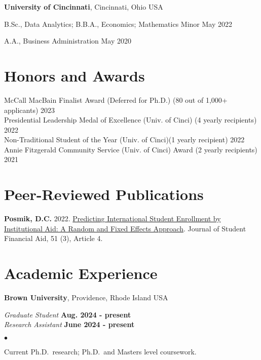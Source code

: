\documentclass[margin,line]{res}
\newenvironment{list1}{
  \begin{list}{\ding{113}}{%
      \setlength{\itemsep}{0in}
      \setlength{\parsep}{0in} \setlength{\parskip}{0in}
      \setlength{\topsep}{0in} \setlength{\partopsep}{0in} 
      \setlength{\leftmargin}{0.17in}}}{\end{list}}
\newenvironment{list2}{
  \begin{list}{$\bullet$}{%
      \setlength{\itemsep}{0in}
      \setlength{\parsep}{0in} \setlength{\parskip}{0in}
      \setlength{\topsep}{0in} \setlength{\partopsep}{0in} 
      \setlength{\leftmargin}{0.2in}}}{\end{list}}
\begin{document}
\begin{resume}
{\bf University of Cincinnati}, Cincinnati, Ohio USA\\
\vspace*{-.15in}
\begin{list1}
\item[] B.Sc., Data Analytics; B.B.A., Economics; Mathematics Minor \hfill May 2022
\item[] A.A., Business Administration \hfill May 2020
\end{list1}


\section{\sc Honors and Awards} 
McCall MacBain Finalist Award (Deferred for Ph.D.) (80 out of 1,000+ applicants) \hfill 2023 \\  
Presidential Leadership Medal of Excellence (Univ. of Cinci) (4 yearly recipients) \hfill 2022 \\ 
Non-Traditional Student of the Year (Univ. of Cinci)(1 yearly recipient) \hfill 2022 \\
Annie Fitzgerald Community Service (Univ. of Cinci) Award (2 yearly recipients) \hfill 2021


\section{\sc Peer-Reviewed Publications}
{\bf Posmik, D.C.} 2022. \href{https://ir.library.louisville.edu/jsfa/vol51/iss3/4/}{Predicting International Student Enrollment by Institutional Aid: A Random and Fixed Effects Approach}. Journal of Student Financial Aid, 51 (3), Article 4.  


\section{\sc Academic Experience}
{\bf Brown University}, Providence, Rhode Island USA

\vspace{-.3cm}
{\em Graduate Student} \hfill {\bf Aug. 2024 - present}\\
{\em Research Assistant} \hfill {\bf June 2024 - present}\\

\begin{list2}
\item Current Ph.D.~research; Ph.D.~and Masters level coursework. 
\end{list2}


\end{resume}
\end{document}
